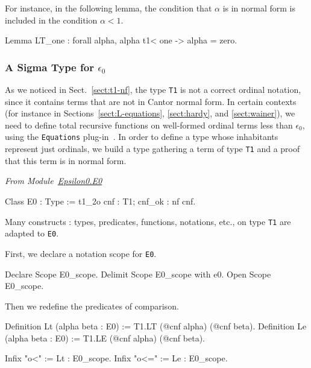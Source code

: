 \label{Predicates:LT-T1}
 

For instance, in the following lemma, the condition that $\alpha$ is in normal form is included in the condition $\alpha< 1$.

\begin{Coqsrc}
Lemma LT_one : forall alpha, alpha t1< one -> alpha = zero.
\end{Coqsrc}

  
\subsubsection{A Sigma Type for \texorpdfstring{$\epsilon_0$}{epsilon0}}

As we noticed in Sect.~\ref{sect:t1-nf}, the type \texttt{T1} is not a correct ordinal notation, since it contains terms that are not in Cantor normal form. In certain contexts (for instance in Sections~\ref{sect:L-equations}, \ref{sect:hardy},
and \ref{sect:wainer}),  we need to define total recursive functions on well-formed ordinal terms less  than $\epsilon_0$, using the \texttt{Equations} plug-in~\cite{sozeau:hal-01671777}.
 In order to define a type whose inhabitants represent just ordinals, we build a type gathering a term of type \texttt{T1} and a proof that this term is in normal form.
 

\label{sect:E0-def}
\label{types:E0}

\emph{From Module~\href{../theories/html/hydras.Epsilon0.E0.html}{Epsilon0.E0}}



\begin{Coqsrc}
Class E0 : Type := t1_2o {cnf : T1; cnf_ok : nf cnf}.
\end{Coqsrc}

Many constructs : types, predicates, functions, notations, etc., on type \texttt{T1} are adapted to \texttt{E0}.

First, we declare a notation scope for \texttt{E0}.

\begin{Coqsrc}
Declare Scope E0_scope.
Delimit Scope E0_scope with e0.
Open Scope E0_scope.
\end{Coqsrc}

Then we redefine the predicates of comparison.

\label{Predicates:Lt-E0}

\begin{Coqsrc}
Definition Lt (alpha beta : E0) := T1.LT (@cnf alpha) (@cnf beta).
Definition Le (alpha beta : E0) := T1.LE (@cnf alpha) (@cnf beta).

Infix "o<" := Lt : E0_scope.
Infix "o<=" := Le : E0_scope.
\end{Coqsrc}
  

